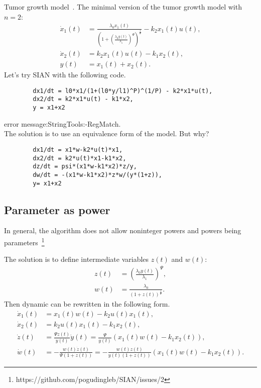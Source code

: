 \documentclass[10pt]{beamer}
\begin{document}
\begin{frame}[fragile]{Tumor growth model~.}
	The minimal version of the tumor growth model with $n=2$:
	\begin{subequations}
		\begin{align}
			\dot x_1(t) &= \frac{\lambda_0 x_1(t)}{(1+(\frac{\lambda_0 y(t)}{\lambda_1})^\Psi)^\frac{1}{\Psi}} - k_2 x_1(t) u(t), \\
			\dot x_2(t) &= k_2 x_1(t) u(t) - k_1 x_2(t), \\
			y(t) &= x_1(t) + x_2(t).
		\end{align}
	\end{subequations}
	Let's try SIAN with the following code.
	\begin{lstlisting}
		dx1/dt = l0*x1/(1+(l0*y/l1)^P)^(1/P) - k2*x1*u(t),
		dx2/dt = k2*x1*u(t) - k1*x2,
		y = x1+x2
	\end{lstlisting}
	\color{red} error message:StringTools:-RegMatch. \\ 
	\color{black} The solution is to use an equivalence form of the model. But why?
	\begin{lstlisting}
		dx1/dt = x1*w-k2*u(t)*x1, 
		dx2/dt = k2*u(t)*x1-k1*x2,
		dz/dt = psi*(x1*w-k1*x2)*z/y,
		dw/dt = -(x1*w-k1*x2)*z*w/(y*(1+z)),
		y= x1+x2
	\end{lstlisting}
\end{frame}

\subsection{Parameter as power}

\begin{frame}{In general, the algorithm does not allow noninteger powers and powers being parameters~\footnote{https://github.com/pogudingleb/SIAN/issues/2}}
	
	The solution is to define intermediate variables $z(t)$ and $w(t)$:
	\begin{subequations}
		\begin{align}
			z(t) &= (\frac{\lambda_0 y(t)}{\lambda_1})^\Psi, \\
			w(t) &= \frac{\lambda_0}{(1+z(t))^\frac{1}{\Psi}}.
		\end{align}
	\end{subequations}
	Then dynamic can be rewritten in the following form.
	\begin{subequations}
		\begin{align}
			\dot x_1(t) &= x_1(t) w(t) - k_2 u(t) x_1(t), \\
			\dot x_2(t) &= k_2 u(t) x_1(t) - k_1 x_2(t), \\
			\dot z(t) &=  \frac{\Psi z(t)}{y(t)} \dot y(t) = 
			\frac{\Psi}{y(t)} (x_1(t) w(t) - k_1 x_2(t)), \\
			\dot w(t) &= - \frac{w(t) \dot z(t)}{\Psi (1+z(t))} = 
			- \frac{w(t) z(t)}{y(t) (1+z(t))} (x_1(t) w(t) - k_1 x_2(t)).
		\end{align}
	\end{subequations}
\end{frame}
\end{document}
